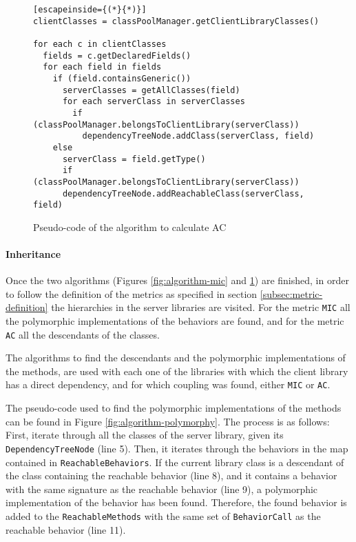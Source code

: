 \begin{figure}[ht!]
\begin{lstlisting}[escapeinside={(*}{*)}]
clientClasses = classPoolManager.getClientLibraryClasses()

for each c in clientClasses
  fields = c.getDeclaredFields()
  for each field in fields
    if (field.containsGeneric())
      serverClasses = getAllClasses(field)
      for each serverClass in serverClasses
        if (classPoolManager.belongsToClientLibrary(serverClass))
          dependencyTreeNode.addClass(serverClass, field)
    else
      serverClass = field.getType()
      if (classPoolManager.belongsToClientLibrary(serverClass))
      dependencyTreeNode.addReachableClass(serverClass, field)
\end{lstlisting}
\caption{Pseudo-code of the algorithm to calculate AC}
\label{fig:algorithm-ac}
\end{figure}

\paragraph{Inheritance}
Once the two algorithms (Figures \ref{fig:algorithm-mic} and \ref{fig:algorithm-ac}) are finished, in order to follow the definition of the metrics as specified in section \ref{subsec:metric-definition} the hierarchies in the server libraries are visited. For the metric \texttt{MIC} all the polymorphic implementations of the behaviors are found, and for the metric \texttt{AC} all the descendants of the classes.

The algorithms to find the descendants and the polymorphic implementations of the methods, are used with each one of the libraries with which the client library has a direct dependency, and for which coupling was found, either \texttt{MIC} or \texttt{AC}.

The pseudo-code used to find the polymorphic implementations of the methods can be found in Figure \ref{fig:algorithm-polymorphy}. The process is as follows: First, iterate through all the classes of the server library, given its \texttt{DependencyTreeNode} (line 5). Then, it iterates through the behaviors in the map contained in \texttt{ReachableBehaviors}. If the current library class is a descendant of the class containing the reachable behavior (line 8), and it contains a behavior with the same signature as the reachable behavior (line 9), a polymorphic implementation of the behavior has been found. Therefore, the found behavior is added to the \texttt{ReachableMethods} with the same set of \texttt{BehaviorCall} as the reachable behavior (line 11).

